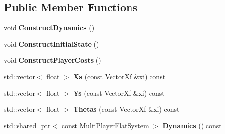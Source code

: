 \subsection*{Public Member Functions}
\begin{DoxyCompactItemize}
\item 
void {\bfseries Construct\+Dynamics} ()\hypertarget{classilqgames_1_1_three_player_flat_intersection_example_a087ad83105de81828a3e9cd79ed445bc}{}\label{classilqgames_1_1_three_player_flat_intersection_example_a087ad83105de81828a3e9cd79ed445bc}

\item 
void {\bfseries Construct\+Initial\+State} ()\hypertarget{classilqgames_1_1_three_player_flat_intersection_example_a2a85eeaf147c5c6bd97867e44f9d9247}{}\label{classilqgames_1_1_three_player_flat_intersection_example_a2a85eeaf147c5c6bd97867e44f9d9247}

\item 
void {\bfseries Construct\+Player\+Costs} ()\hypertarget{classilqgames_1_1_three_player_flat_intersection_example_ad1beefb2af9f731ec7f3425fda2608ec}{}\label{classilqgames_1_1_three_player_flat_intersection_example_ad1beefb2af9f731ec7f3425fda2608ec}

\item 
std\+::vector$<$ float $>$ {\bfseries Xs} (const Vector\+Xf \&xi) const \hypertarget{classilqgames_1_1_three_player_flat_intersection_example_ad4c92ff703b198cf937df281f09d176a}{}\label{classilqgames_1_1_three_player_flat_intersection_example_ad4c92ff703b198cf937df281f09d176a}

\item 
std\+::vector$<$ float $>$ {\bfseries Ys} (const Vector\+Xf \&xi) const \hypertarget{classilqgames_1_1_three_player_flat_intersection_example_a5f60f5d993fec248893fcbda45aad15a}{}\label{classilqgames_1_1_three_player_flat_intersection_example_a5f60f5d993fec248893fcbda45aad15a}

\item 
std\+::vector$<$ float $>$ {\bfseries Thetas} (const Vector\+Xf \&xi) const \hypertarget{classilqgames_1_1_three_player_flat_intersection_example_aaffec79328bcd92dc2d5c8bd0aada196}{}\label{classilqgames_1_1_three_player_flat_intersection_example_aaffec79328bcd92dc2d5c8bd0aada196}

\item 
std\+::shared\+\_\+ptr$<$ const \hyperlink{classilqgames_1_1_multi_player_flat_system}{Multi\+Player\+Flat\+System} $>$ {\bfseries Dynamics} () const \hypertarget{classilqgames_1_1_three_player_flat_intersection_example_a2a4043278484419adf07ed5268453df3}{}\label{classilqgames_1_1_three_player_flat_intersection_example_a2a4043278484419adf07ed5268453df3}

\end{DoxyCompactItemize}
